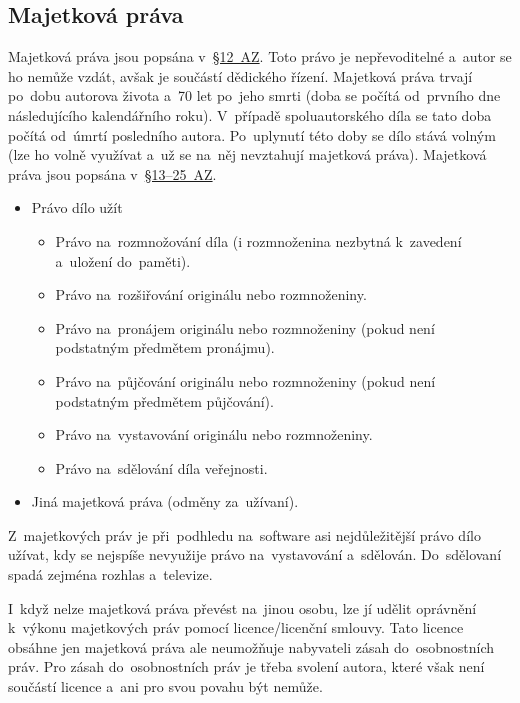 \subsection{Majetková práva}

Majetková práva jsou popsána v~\href{https://www.zakonyprolidi.cz/cs/2000-121#p12}{§12~AZ}. Toto právo je nepřevoditelné a~autor se ho nemůže vzdát, avšak je součástí dědického řízení.
Majetková práva trvají po~dobu autorova života a~70 let po~jeho smrti (doba se počítá od~prvního dne následujícího kalendářního roku). V~případě spoluautorského díla se tato doba počítá od~úmrtí posledního autora. Po~uplynutí této doby se dílo  stává volným (lze ho volně využívat a~už se na~něj nevztahují majetková práva). Majetková práva jsou popsána v~\href{https://www.zakonyprolidi.cz/cs/2000-121#p13}{§13--25~AZ}.

\begin{itemize}
	\item Právo dílo užít
	\begin{itemize}
		\item Právo na~rozmnožování díla (i rozmnoženina nezbytná k~zavedení a~uložení do~paměti).
		\item Právo na~rozšiřování originálu nebo rozmnoženiny.
		\item Právo na~pronájem originálu nebo rozmnoženiny (pokud není podstatným předmětem pronájmu).
		\item Právo na~půjčování originálu nebo rozmnoženiny (pokud není podstatným předmětem půjčování).
		\item Právo na~vystavování originálu nebo rozmnoženiny.
		\item Právo na~sdělování díla veřejnosti.
	\end{itemize}
	\item Jiná majetková práva (odměny za~užívaní).
\end{itemize}

Z~majetkových práv je při~podhledu na~software asi nejdůležitější právo dílo užívat, kdy se nejspíše nevyužije právo na~vystavování a~sdělován. Do~sdělovaní spadá zejména rozhlas a~televize.

I~když nelze majetková práva převést na~jinou osobu, lze jí udělit oprávnění k~výkonu majetkových práv pomocí licence/licenční smlouvy. Tato licence obsáhne jen majetková práva ale neumožňuje nabyvateli zásah do~osobnostních práv. Pro zásah do~osobnostních práv je třeba svolení autora, které však není součástí licence a~ani pro svou povahu být nemůže.

